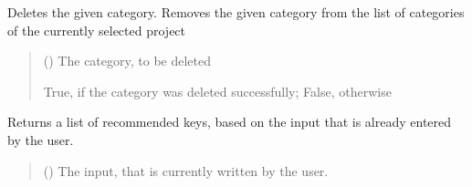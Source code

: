 \documentclass[letterpaper,10pt,english]{sphinxmanual}
\begin{document}
\begin{fulllineitems}
\begin{fulllineitems}
\label{\detokenize{apidoc/src.osm_configurator.control:src.osm_configurator.control.control_interface.IControl.delete_category}}
\pysigstartsignatures
{}
\pysigstopsignatures
\sphinxAtStartPar
Deletes the given category.
Removes the given category from the list of categories of the currently selected project
\begin{quote}\begin{description}
\sphinxAtStartPar
{} ({\hyperref[\detokenize{apidoc/src.osm_configurator.model.project.configuration:src.osm_configurator.model.project.configuration.category.Category}]{}}) \textendash{} The category, to be deleted

\sphinxAtStartPar
True, if the category was deleted successfully; False, otherwise

\sphinxAtStartPar
{}

\end{description}\end{quote}

\end{fulllineitems}


\begin{fulllineitems}
\label{\detokenize{apidoc/src.osm_configurator.control:src.osm_configurator.control.control_interface.IControl.get_list_of_key_recommendations}}
\pysigstartsignatures
{}
\pysigstopsignatures
\sphinxAtStartPar
Returns a list of recommended keys, based on the input that is already entered by the user.
\begin{quote}\begin{description}
\sphinxAtStartPar
{} () \textendash{} The input, that is currently written by the user.


\end{description}
\end{quote}
\end{fulllineitems}
\end{fulllineitems}
\end{document}
